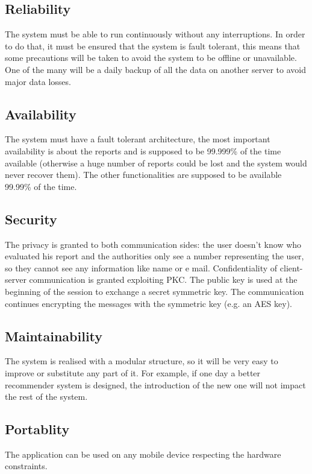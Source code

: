 \documentclass[12pt,a4paper]{report}
\begin{document}
		\subsection{Reliability}
			The system must be able to run continuously without any interruptions. In order to do that, it must 
			be ensured  that  the system is fault tolerant, this means that some precautions will be taken to avoid the system
			to be offline or unavailable. One of the many will be a daily backup of all the data on another server to avoid major
			data losses.
		\subsection{Availability}
			The system must have a fault tolerant architecture, the most important availability is about the reports and is supposed
			to be 99.999\%  of the time available (otherwise a huge number of reports could be lost and the system would never recover them). The other
			functionalities are supposed to be available 99.99\% of the time.
		\subsection{Security}
			The privacy is granted to both communication sides: the user doesn't know who evaluated his report and the authorities
			only see a number representing the user, so they cannot see any information like name or e mail. Confidentiality of client-server communication is granted exploiting PKC. The public key is used at the beginning of the session to exchange a secret symmetric key. The communication continues encrypting the messages with the symmetric key (e.g. an AES key). 
		\subsection{Maintainability}
			The system is realised with a modular structure, so it will be very easy to improve or substitute any part of it. For example, if one day a better recommender system is designed, the
			introduction of the new one will not impact the rest of the system.
		\subsection{Portablity}
			The application can be used on any mobile device respecting the hardware constraints.


	
\end{document}
